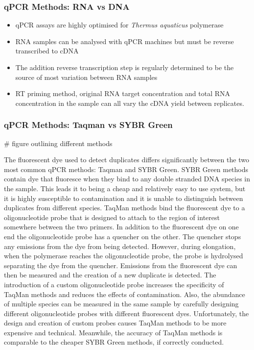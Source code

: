 \documentclass{SBCbookchapter}
\begin{document}
\subsubsection{qPCR Methods: RNA vs DNA}

\begin{itemize}
    \item qPCR assays are highly optimised for \textit{Thermus aquaticus} polymerase
    \item RNA samples can be analysed with qPCR machines but must be reverse transcribed to cDNA
    \item The addition reverse transcription step is regularly determined to be the source of most variation between RNA samples \cite{Stahlberg2004}
    \item RT priming method, original RNA target concentration and total RNA concentration in the sample can all vary the cDNA yield between replicates.
\end{itemize}

\subsubsection{qPCR Methods: Taqman vs SYBR Green}

# figure outlining different methods


The fluorescent dye used to detect duplicates differs significantly between the two most common qPCR methods: Taqman and SYBR Green. SYBR Green methods contain dye that fluoresce when they bind to any double stranded DNA species in the sample. This leads it to being a cheap and relatively easy to use system, but it is highly susceptible to contamination and it is unable to distinguish between duplicates from different species. TaqMan methods bind the fluorescent dye to a oligonucleotide probe that is designed to attach to the region of interest somewhere between the two primers. In addition to the fluorescent dye on one end the oligonucleotide probe has a quencher on the other. The quencher stops any emissions from the dye from being detected. However, during elongation, when the polymerase reaches the oligonucleotide probe, the probe is hydrolysed separating the dye from the quencher. Emissions from the fluorescent dye can then be measured and the creation of a new duplicate is detected. The introduction of a custom oligonucleotide probe increases the specificity of TaqMan methods and reduces the effects of contamination. Also, the abundance of multiple species can be measured in the same sample by carefully designing different oligonucleotide probes with different fluorescent dyes. Unfortunately, the design and creation of custom probes causes TaqMan methods to be more expensive and technical. Meanwhile, the accuracy of TaqMan methods is comparable to the cheaper SYBR Green methods, if correctly conducted. \cite{Tajadini2014}
\end{document}
